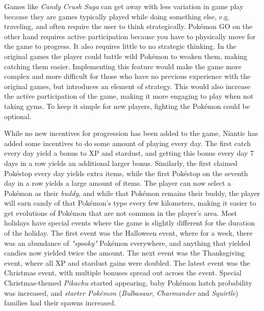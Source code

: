 Games like \emph{Candy Crush Saga} can get away with less variation in game play because they are games typically played while doing something else, e.g. traveling, and often require the user to think strategically. Pokémon GO on the other hand requires active participation because you have to physically move for the game to progress. It also requires little to no strategic thinking. In the original games the player could battle wild Pokémon to weaken them, making catching them easier. Implementing this feature would make the game more complex and more difficult for those who have no previous experience with the original games, but introduces an element of strategy. This would also increase the active participation of the game, making it more engaging to play when not taking gyms. To keep it simple for new players, fighting the Pokémon could be optional.

While no new incentives for progression has been added to the game, Niantic has added some incentives to do some amount of playing every day. The first catch every day yield a bonus to XP and stardust, and getting this bonus every day 7 days in a row yields an additional larger bonus. Similarly, the first claimed Pokéstop every day yields extra items, while the first Pokéstop on the seventh day in a row yields a large amount of items. The player can now select a Pokémon as their \emph{buddy}, and while that Pokémon remains their buddy, the player will earn candy of that Pokémon's type every few kilometers, making it easier to get evolutions of Pokémon that are not common in the player's area. Most holidays have special events where the game is slightly different for the duration of the holiday. The first event was the Halloween event, where for a week, there was an abundance of \emph{"spooky"} Pokémon everywhere, and anything that yielded candies now yielded twice the amount. The next event was the Thanksgiving event, where all XP and stardust gains were doubled. The latest event was the Christmas event, with multiple bonuses spread out across the event. Special Christmas-themed \emph{Pikachu} started appearing, baby Pokémon hatch probability was increased, and \emph{starter Pokémon} (\emph{Bulbasaur}, \emph{Charmander} and \emph{Squirtle}) families had their spawns increased.

\begin{figure}[h]
	\centering
	\caption{}
\end{figure}



